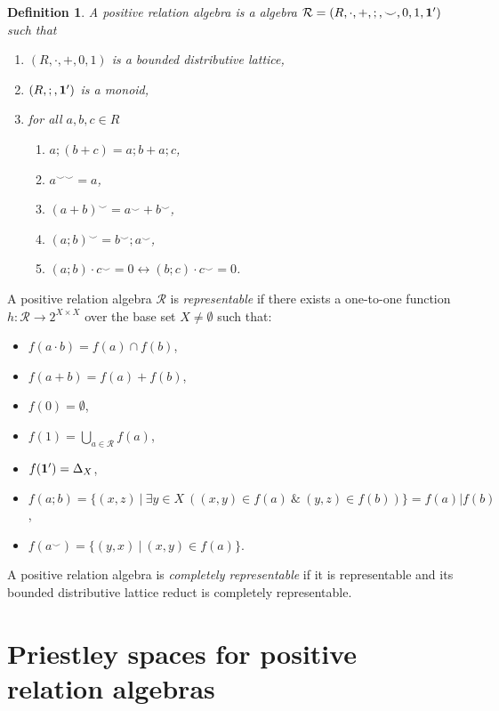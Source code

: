 \documentclass[a4paper]{article}
\theoremstyle{defin}
\newtheorem{definition}{Definition}
\theoremstyle{theorem}
\theoremstyle{claim}
\theoremstyle{prop}
\theoremstyle{lemma}
\theoremstyle{fact}
\theoremstyle{ex}
\theoremstyle{col}
\begin{document}
\begin{definition}

A positive relation algebra is a algebra $\mathcal{R} = (R, \cdot, +, ;, \smile, 0, 1, {\bf 1}')$ such that
\begin{enumerate}
\item $(R, \cdot, +, 0, 1)$ is a bounded distributive lattice,
\item $(R, ;, {\bf 1}')$ is a monoid,
\item for all $a, b, c \in R$
\begin{enumerate}
\item $a ; (b + c) = a ; b + a ; c$,
\item $a^{\smile \smile} = a$,
\item $(a + b)^{\smile} = a^{\smile} + b^{\smile}$,
\item $(a ; b)^{\smile} = b^{\smile} ; a^{\smile}$,
\item $(a ; b) \cdot c^{\smile} = 0 \leftrightarrow (b ; c) \cdot c^{\smile} = 0$.
\end{enumerate}
\end{enumerate}
\end{definition}

A positive relation algebra $\mathcal{R}$ is \emph{representable} if there exists a one-to-one function $h : \mathcal{R} \to 2^{X \times X}$ over the base set $X \neq \emptyset$ such that:
\begin{itemize}
\item $f(a \cdot b) = f(a) \cap f(b)$,
\item $f(a + b) = f(a) + f(b)$,
\item $f(0) = \emptyset$,
\item $f(1) = \bigcup \limits_{a \in \mathcal{R}} f(a)$,
\item $f({\bf 1}') = \Delta_X$,
\item $f(a ; b) = \{ (x, z) \: | \: \exists y \in X \: ((x, y) \in f(a) \: \& \: (y,z) \in f(b))\} = f(a) | f(b)$,
\item $f(a^{\smile}) = \{ (y, x) \: | \: (x, y) \in f(a) \}$.
\end{itemize}

A positive relation algebra is \emph{completely representable} if it is representable and its bounded distributive lattice reduct is completely representable.

\section{Priestley spaces for positive relation algebras}
\end{document}
